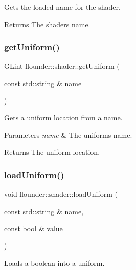 Gets the loaded name for the shader. 

\begin{DoxyReturn}{Returns}
The shaders name. 
\end{DoxyReturn}
\mbox{\label{classflounder_1_1shader_ab4d3af8b3ffe94ff901b15376215c2e2}} 
\subsubsection{\texorpdfstring{get\+Uniform()}{getUniform()}}
{\footnotesize\ttfamily G\+Lint flounder\+::shader\+::get\+Uniform (\begin{DoxyParamCaption}\item[{const std\+::string \&}]{name }\end{DoxyParamCaption})}



Gets a uniform location from a name. 


\begin{DoxyParams}{Parameters}
{\em name} & The uniforms name. \\
\hline
\end{DoxyParams}
\begin{DoxyReturn}{Returns}
The uniform location. 
\end{DoxyReturn}
\mbox{\label{classflounder_1_1shader_a1767f4ca2d3b1eb35dc4435e2aa3fd67}} 
\subsubsection{\texorpdfstring{load\+Uniform()}{loadUniform()}\hspace{0.1cm}{\footnotesize\ttfamily [1/13]}}
{\footnotesize\ttfamily void flounder\+::shader\+::load\+Uniform (\begin{DoxyParamCaption}\item[{const std\+::string \&}]{name,  }\item[{const bool \&}]{value }\end{DoxyParamCaption})}



Loads a boolean into a uniform. 


